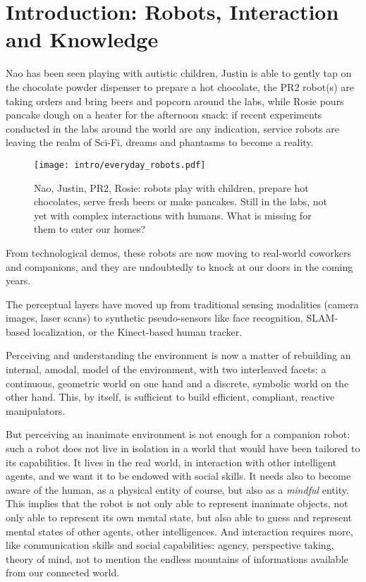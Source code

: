 \chapter{Introduction: Robots, Interaction and Knowledge}
\label{chapt|introduction}

Nao has been seen playing with autistic children, Justin is able to gently tap
on the chocolate powder dispenser to prepare a hot chocolate, the PR2 robot(s)
are taking orders and bring beers and popcorn around the labs, while Rosie
pours pancake dough on a heater for the afternoon snack: if recent experiments
conducted in the labs around the world are any indication, service robots are
leaving the realm of Sci-Fi, dreams and phantasms to become a reality.

\begin{figure}[!h]
    \centering
    \texttt{[image: intro/everyday\_robots.pdf]}

    \caption*{Nao, Justin, PR2, Rosie: robots play with children, prepare hot
    chocolates, serve fresh beers or make pancakes. Still in the labs, not
    yet with complex interactions with humans. What is missing for them to
    enter our homes?}

    \label{fig|everyday-robots}
\end{figure}

From technological demos, these robots are now moving to real-world coworkers
and companions, and they are undoubtedly to knock at our doors in the coming
years.

The perceptual layers have moved up from traditional sensing modalities (camera
images, laser scans) to synthetic pseudo-sensors like face recognition,
SLAM-based localization, or the Kinect-based human tracker.

Perceiving and understanding the environment is now a matter of rebuilding an
internal, amodal, model of the environment, with two interleaved facets: a
continuous, geometric world on one hand and a discrete, symbolic world on the
other hand. This, by itself, is sufficient to build efficient, compliant,
reactive manipulators.

But perceiving an inanimate environment is not enough for a companion robot:
such a robot does not live in isolation in a world that would have been
tailored to its capabilities. It lives in the real world, in interaction with
other intelligent agents, and we want it to be endowed with social skills. It
needs also to become aware of the human, as a physical entity of course, but
also as a \emph{mindful} entity. This implies that the robot is not only able
to represent inanimate objects, not only able to represent its own mental
state, but also able to guess and represent mental states of other agents,
other intelligences. And interaction requires more, like communication skills
and social capabilities: agency, perspective taking, theory of mind, not to
mention the endless mountains of informations available from our connected
world.

